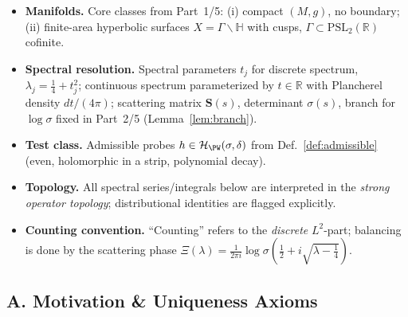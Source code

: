 \begin{tcolorbox}[colback=gray!5,colframe=gray!35,
  title=Scope \& Assumptions (ZNB-9+++ • MEA-Core-SS • enforced)]
\begin{itemize}
  \item \textbf{Manifolds.} Core classes from Part~1/5: (i) compact $(M,g)$, no boundary; (ii) finite-area hyperbolic surfaces $X=\Gamma\backslash\mathbb H$ with cusps, $\Gamma\subset\mathrm{PSL}_2(\mathbb R)$ cofinite.
  \item \textbf{Spectral resolution.} Spectral parameters $t_j$ for discrete spectrum, $\lambda_j=\tfrac14+t_j^2$; continuous spectrum parameterized by $t\in\mathbb R$ with Plancherel density $dt/(4\pi)$; scattering matrix $\mathbf S(s)$, determinant $\sigma(s)$, branch for $\log\sigma$ fixed in Part~2/5 (Lemma~\ref{lem:branch}).
  \item \textbf{Test class.} Admissible probes $h\in \mathcal H_{\PW}(\sigma,\delta)$ from Def.~\ref{def:admissible} (even, holomorphic in a strip, polynomial decay).
  \item \textbf{Topology.} All spectral series/integrals below are interpreted in the \emph{strong operator topology}; distributional identities are flagged explicitly.
  \item \textbf{Counting convention.} ``Counting'' refers to the \emph{discrete} $L^2$-part; balancing is done by the scattering phase $\Xi(\lambda)=\frac{1}{2\pi i}\log\sigma(\frac12+i\sqrt{\lambda-\frac14})$.
\end{itemize}
\end{tcolorbox}

\subsection*{A. Motivation \& Uniqueness Axioms}
\label{subsec:axioms}

